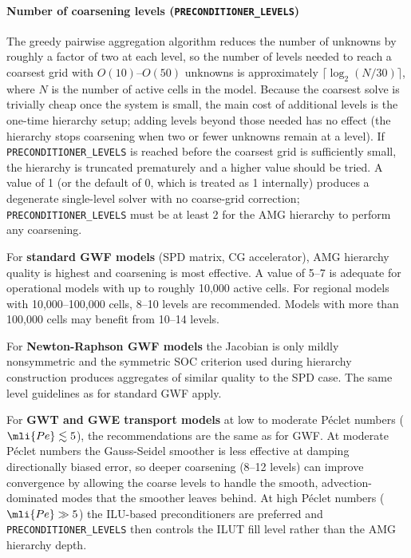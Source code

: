 \paragraph{Number of coarsening levels (\texttt{PRECONDITIONER\_LEVELS})}
The greedy pairwise aggregation algorithm reduces the number of unknowns by roughly a factor of two at each level, so the number of levels needed to reach a coarsest grid with $O(10)$--$O(50)$ unknowns is approximately $\lceil \log_2(N/30) \rceil$, where $N$ is the number of active cells in the model. Because the coarsest solve is trivially cheap once the system is small, the main cost of additional levels is the one-time hierarchy setup; adding levels beyond those needed has no effect (the hierarchy stops coarsening when two or fewer unknowns remain at a level). If \texttt{PRECONDITIONER\_LEVELS} is reached before the coarsest grid is sufficiently small, the hierarchy is truncated prematurely and a higher value should be tried. A value of 1 (or the default of 0, which is treated as 1 internally) produces a degenerate single-level solver with no coarse-grid correction; \texttt{PRECONDITIONER\_LEVELS} must be at least 2 for the AMG hierarchy to perform any coarsening.

For \textbf{standard GWF models} (SPD matrix, CG accelerator), AMG hierarchy quality is highest and coarsening is most effective. A value of 5--7 is adequate for operational models with up to roughly 10{,}000 active cells. For regional models with 10{,}000--100{,}000 cells, 8--10 levels are recommended. Models with more than 100{,}000 cells may benefit from 10--14 levels.

For \textbf{Newton-Raphson GWF models} the Jacobian is only mildly nonsymmetric and the symmetric SOC criterion used during hierarchy construction produces aggregates of similar quality to the SPD case. The same level guidelines as for standard GWF apply.

For \textbf{GWT and GWE transport models} at low to moderate Péclet numbers ($\mli{Pe} \lesssim 5$), the recommendations are the same as for GWF. At moderate Péclet numbers the Gauss-Seidel smoother is less effective at damping directionally biased error, so deeper coarsening (8--12 levels) can improve convergence by allowing the coarse levels to handle the smooth, advection-dominated modes that the smoother leaves behind. At high Péclet numbers ($\mli{Pe} \gg 5$) the ILU-based preconditioners are preferred and \texttt{PRECONDITIONER\_LEVELS} then controls the ILUT fill level rather than the AMG hierarchy depth.

